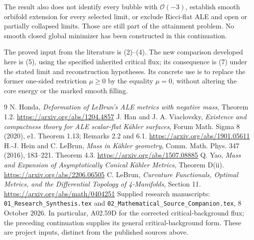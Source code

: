 \documentclass[11pt]{article}
\begin{document}
The result also does not identify every bubble with $\mathcal O(-3)$,
establish smooth orbifold extension for every selected limit, or exclude
Ricci-flat ALE and open or partially collapsed limits. Those are still
part of the attainment problem. No smooth closed global minimizer has
been constructed in this continuation.

The proved input from the literature is (2)--(4). The new comparison
developed here is (5), using the specified inherited critical flux;
its consequence is (7) under the stated limit and reconstruction
hypotheses. Its concrete use is to replace the former one-sided
restriction $\mu\ge0$ by the equality $\mu=0$, without altering the
core energy or the marked smooth filling.

\begin{thebibliography}{9}
 N. Honda, \emph{Deformation of LeBrun's ALE metrics
with negative mass}, Theorem 1.2.\newline
\url{https://arxiv.org/abs/1204.4857}
 J. Han and J. A. Viaclovsky, \emph{Existence and
compactness theory for ALE scalar-flat K\"ahler surfaces}, Forum Math.
Sigma 8 (2020), e1. Theorem 1.13; Remarks 2.2 and 6.1.\newline
\url{https://arxiv.org/abs/1901.05611}
 H.-J. Hein and C. LeBrun, \emph{Mass in K\"ahler geometry},
Comm. Math. Phys. 347 (2016), 183--221. Theorem 4.3.\newline
\url{https://arxiv.org/abs/1507.08885}
 Q. Yao, \emph{Mass and Expansion of Asymptotically
Conical K\"ahler Metrics}, Theorem D(ii).\newline
\url{https://arxiv.org/abs/2206.06505}
 C. LeBrun, \emph{Curvature Functionals, Optimal
Metrics, and the Differential Topology of 4-Manifolds}, Section 11.\newline
\url{https://arxiv.org/abs/math/0404251}
 Supplied research manuscripts:
\texttt{01\_Research\_Synthesis.tex} and
\texttt{02\_Mathematical\_Source\_Companion.tex}, 8 October 2026.
In particular, A02.59D for the corrected critical-background flux;
the preceding continuation supplies its general critical-background
form. These are project inputs, distinct from the published sources above.
\end{thebibliography}
\end{document}
